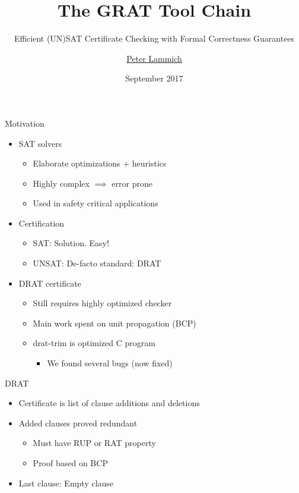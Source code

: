 \documentclass[fleqn]{beamer}
\title{The GRAT Tool Chain}
\subtitle{Efficient (UN)SAT Certificate Checking with Formal Correctness Guarantees}
\author[Peter Lammich]{\underline{Peter Lammich}}
\institute[TUM/VT] %
{ TU M\"unchen / Virginia Tech %
}
\date {September 2017}
\begin{document}
% 

\begin{frame}
  \titlepage
\end{frame}


\begin{frame}{Motivation}
  \begin{itemize}
   \item<+-> SAT solvers
    \begin{itemize}
     \item Elaborate optimizations + heuristics
     \item Highly complex $\implies$ error prone
     \item Used in safety critical applications
    \end{itemize}
   \item<+-> Certification
    \begin{itemize}
     \item SAT: Solution. Easy!
     \item UNSAT: De-facto standard: DRAT
    \end{itemize}
   \item<+-> DRAT certificate
    \begin{itemize}
     \item Still requires highly optimized checker
     \item Main work spent on unit propagation (BCP)
     \item drat-trim is optimized C program
      \begin{itemize}
       \item We found several bugs (now fixed)
    
      \end{itemize}
    \end{itemize}
  \end{itemize}
\end{frame}
\begin{frame}{DRAT}
  \begin{itemize}
   \item Certificate is list of clause additions and deletions
   \item Added clauses proved redundant
    \begin{itemize}
     \item Must have RUP or RAT property
     \item Proof based on BCP
    \end{itemize}
   \item Last clause: Empty clause
  
  \end{itemize}
\end{frame}
\end{document}
